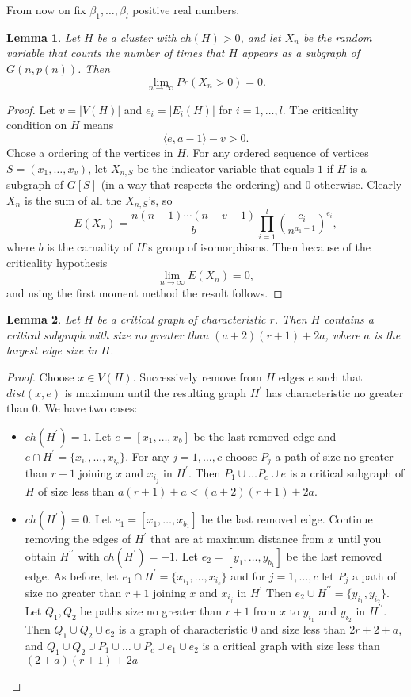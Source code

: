 \documentclass[11pt,notitlepage]{report}
\newtheorem{lemma}{Lemma}[chapter]
\theoremstyle{definition}
\newcommand{\Ln}{\lim\limits_{n\to \infty}}
\begin{document}
From now on fix $\beta_1,\dots,\beta_l$ positive real numbers. 

\begin{lemma}
	Let $H$ be a cluster with $ch(H)>0$, and let $X_n$ be the
	random variable that counts the number of times that $H$ appears
	as a subgraph of $G(n,p(n))$. Then
	\[\Ln Pr(X_n>0)=0. \]
\end{lemma}
\begin{proof}
	Let $v=|V(H)|$ and $e_i=|E_i(H)|$ for $i=1,\dots, l$. 
	The criticality condition on $H$ means 
	\[ \langle e, a-1 \rangle - v > 0 .\]
	Chose a ordering of the vertices in $H$. 
	For any ordered sequence of vertices $S=(x_1, \dots, x_v)$, 
	let $X_{n,S}$ be the indicator variable that equals $1$ if $H$
	is a subgraph of $G[S]$ (in a way that respects the ordering) and
	$0$ otherwise. Clearly $X_n$ is the sum of all the $X_{n,S}$'s, so
	\[ E(X_n)= \frac{n(n-1)\cdots (n-v+1)}{b} \prod_{i=1}^{l}
	\left( \frac{c_i}{n^{a_1-1}}\right) ^{e_i}, \] 
	where $b$ is the carnality of $H$'s group of isomorphisms. 
	Then because of the criticality hypothesis
	\[ \Ln E(X_n)=0, \]
	and using the first moment method 
	the result follows. 
\end{proof}

\begin{lemma}
	Let $H$ be a critical graph of characteristic $r$.
	Then $H$ contains a critical subgraph with size no greater than
	$(a+2)(r+1)+2a$, where $a$ is the largest edge size in $H$. 
\end{lemma}
\begin{proof}
	Choose $x\in V(H)$. Successively remove from $H$ edges $e$
	such that $dist(x, e)$ is maximum until the resulting graph 
	$H^\prime$ has characteristic no greater than $0$. We have two cases:
	\begin{itemize}
		\item $ch(H^\prime)=1$. Let $e=[x_1, \dots, x_b]$ be
		the last removed edge and
		$e\cap H^\prime=\{ x_{i_1}, \dots, x_{i_c}\}$.
		For any $j=1,\dots, c$ choose 
		$P_j$ a path of size no greater than $r+1$ joining
		$x$ and $x_{i_j}$ in $H^\prime$.   
		Then $P_1\cup \dots P_c \cup e$ is a critical subgraph of $H$
		of size less than $a(r+1) + a< (a+2)(r+1) + 2a$.
		\item $ch(H^\prime)=0$. Let $e_1=[x_1, \dots, x_{b_1}]$ be the
		last removed edge. Continue removing the edges of $H^\prime$ 
		that are at maximum distance from $x$ until you obtain 
		$H^{\prime \prime}$ with $ch(H^\prime)=-1$. Let 
		$e_2=[y_1, \dots, y_{b_1}]$ be the last removed edge.
		As before, let $e_1\cap H^\prime=\{ x_{i_1}, \dots, x_{i_c}\}$
		and for $j=1,\dots, c$ let $P_j$ a path of size no greater than $r+1$ 
		joining	$x$ and $x_{i_j}$ in $H^\prime$
		Then $e_2 \cup H^{\prime \prime}=\{ y_{i_1}, y_{i_2}  \}$.
		Let $Q_1, Q_2$ be paths size no greater than $r+1$ from
		$x$ to $y_{i_1}$ and $y_{i_2}$ in $H^{\prime \prime}$.
		Then $Q_1 \cup Q_2 \cup e_2$ is a graph of characteristic $0$ 
		and size less than $2r+2 + a$,
		and $Q_1\cup Q_2\cup P_1 \cup \dots \cup P_c \cup e_1 \cup e_2$ 
		is a critical graph	with size less than $(2+a)(r+1) + 2a$	
	\end{itemize} 
\end{proof}
\end{document}
